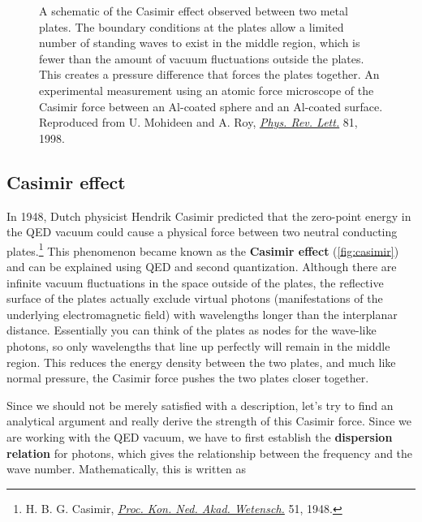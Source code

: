 \begin{figure}[!h]
	\centering
	 \hspace{2ex}
	\caption{\protect{} A schematic of the Casimir effect observed between two metal plates. 
	The boundary conditions at the plates allow a limited number of standing waves to exist in the middle region, which is fewer than the amount of vacuum fluctuations outside the plates. 
	This creates a pressure difference that forces the plates together. 
	\protect{} An experimental measurement using an atomic force microscope of the Casimir force between an Al-coated sphere and an Al-coated surface. 
	Reproduced from U. Mohideen and A. Roy, \href{https://journals.aps.org/prl/abstract/10.1103/PhysRevLett.81.4549}{\emph{Phys. Rev. Lett.}} 81, 1998.}
	\label{fig:casimir}
\end{figure}


\subsection{Casimir effect}

In 1948, Dutch physicist Hendrik Casimir predicted that the zero-point energy in the QED vacuum could cause a physical force between two neutral conducting plates.\footnote{H. B. G. Casimir, \href{http://www.dwc.knaw.nl/DL/publications/PU00018547.pdf}{\emph{Proc. Kon. Ned. Akad. Wetensch.}} 51, 1948.} 
This phenomenon became known as the \textbf{Casimir effect} (\autoref{fig:casimir}) and can be explained using QED and second quantization. 
Although there are infinite vacuum fluctuations in the space outside of the plates, the reflective surface of the plates actually exclude virtual photons (manifestations of the underlying electromagnetic field) with wavelengths longer than the interplanar distance. 
Essentially you can think of the plates as nodes for the wave-like photons, so only wavelengths that line up perfectly will remain in the middle region. 
This reduces the energy density between the two plates, and much like normal pressure, the Casimir force pushes the two plates closer together.

Since we should not be merely satisfied with a description, let's try to find an analytical argument and really derive the strength of this Casimir force. 
Since we are working with the QED vacuum, we have to first establish the \textbf{dispersion relation} for photons, which gives the relationship between the frequency and the wave number. 
Mathematically, this is written as

